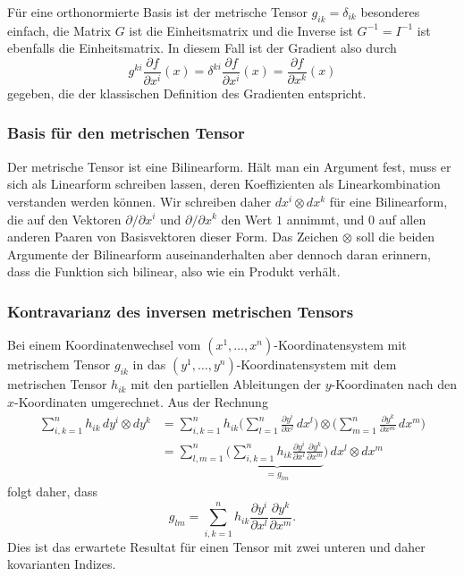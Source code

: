 Für eine orthonormierte Basis ist der metrische Tensor $g_{ik}=\delta_{ik}$
besonderes einfach, die Matrix $G$ ist die Einheitsmatrix und die 
Inverse ist $G^{-1}=I^{-1}$ ist ebenfalls die Einheitsmatrix.
In diesem Fall ist der Gradient also durch
\[
g^{ki}\frac{\partial f}{\partial x^i}(x)
=
\delta^{ki}\frac{\partial f}{\partial x^i}(x)
=
\frac{\partial f}{\partial x^k}(x)
\]
gegeben, die der klassischen Definition des Gradienten entspricht.

%
%
\subsubsection{Basis für den metrischen Tensor}
Der metrische Tensor ist eine Bilinearform.
Hält man ein Argument fest, muss er sich als Linearform schreiben lassen,
deren Koeffizienten als Linearkombination verstanden werden können.
Wir schreiben daher $dx^i\otimes dx^k$ für eine Bilinearform, die auf
den Vektoren $\partial/\partial x^i$ und $\partial/\partial x^k$ den
Wert $1$ annimmt, und $0$ auf allen anderen Paaren von Basisvektoren
dieser Form.
Das Zeichen $\otimes$ soll die beiden Argumente der Bilinearform
auseinanderhalten aber dennoch daran erinnern, dass die Funktion
sich bilinear, also wie ein Produkt verhält.

%
%
\subsubsection{Kontravarianz des inversen metrischen Tensors}
Bei einem Koordinatenwechsel vom $(x^1,\dots,x^n)$-Koordinatensystem
mit metrischem Tensor $g_{ik}$ in das $(y^1,\dots,y^n)$-Koordinatensystem
mit dem metrischen Tensor $h_{ik}$ mit den partiellen Ableitungen
der $y$-Koordinaten nach den $x$-Koordinaten umgerechnet.
Aus der Rechnung
\begin{align*}
\sum_{i,k=1}^n
h_{ik} \, dy^i \otimes dy^k
&=
\sum_{i,k=1}^n
h_{ik}
\biggl(\sum_{l=1}^n \frac{\partial y^i}{\partial x^l}\, dx^l \biggr)
\otimes
\biggl(\sum_{m=1}^n \frac{\partial y^k}{\partial x^m}\, dx^m \biggr)
\\
&=
\sum_{l,m=1}^n
\biggl(
\underbrace{
\sum_{i,k=1}^n h_{ik}
\frac{\partial y^i}{\partial x^l}
\frac{\partial y^k}{\partial x^m}
}_{\displaystyle = g_{lm}}
\biggr)
\,
dx^l\otimes dx^m
\end{align*}
folgt daher, dass
\begin{equation}
g_{lm}
=
\sum_{i,k=1}^n h_{ik}
\frac{\partial y^i}{\partial x^l}
\frac{\partial y^k}{\partial x^m}.
\label{buch:kurvenintegral:differential:eqn:gkovarianz}
\end{equation}
Dies ist das erwartete Resultat für einen Tensor mit zwei unteren 
und daher kovarianten Indizes.

